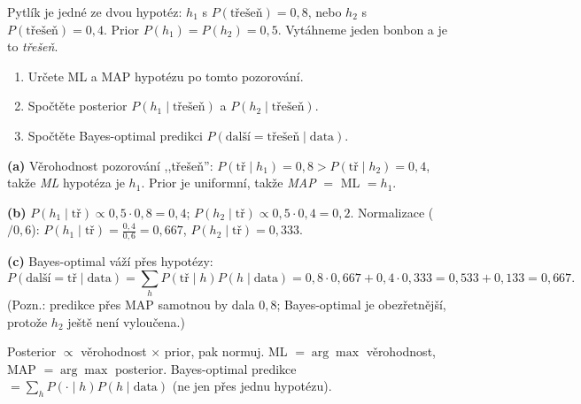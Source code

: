 \begin{zadani}
Pytlík je jedné ze dvou hypotéz: $h_1$ s $P(\text{třešeň})=0{,}8$, nebo $h_2$ s $P(\text{třešeň})=0{,}4$. Prior $P(h_1)=P(h_2)=0{,}5$. Vytáhneme jeden bonbon a je to \emph{třešeň}.
\begin{enumerate}[label=(\alph*)]
  \item {} Určete ML a MAP hypotézu po tomto pozorování.
  \item {} Spočtěte posterior $P(h_1\mid \text{třešeň})$ a $P(h_2\mid \text{třešeň})$.
  \item {} Spočtěte Bayes-optimal predikci $P(\text{další} = \text{třešeň}\mid \text{data})$.
\end{enumerate}
\end{zadani}

\begin{reseni}
\textbf{(a)} Věrohodnost pozorování ,,třešeň'': $P(\text{tř}\mid h_1)=0{,}8 > P(\text{tř}\mid h_2)=0{,}4$, takže \emph{ML} hypotéza je $h_1$. Prior je uniformní, takže \emph{MAP} $=$ ML $=h_1$.

\textbf{(b)} $P(h_1\mid\text{tř})\propto0{,}5\cdot0{,}8=0{,}4$; $P(h_2\mid\text{tř})\propto0{,}5\cdot0{,}4=0{,}2$. Normalizace ($/0{,}6$): $P(h_1\mid\text{tř})=\tfrac{0{,}4}{0{,}6}=0{,}667$, $P(h_2\mid\text{tř})=0{,}333$.

\textbf{(c)} Bayes-optimal váží přes hypotézy:
\[
P(\text{další}{=}\text{tř}\mid\text{data})=\sum_h P(\text{tř}\mid h)P(h\mid\text{data})=0{,}8\cdot0{,}667+0{,}4\cdot0{,}333=0{,}533+0{,}133=0{,}667.
\]
(Pozn.: predikce přes MAP samotnou by dala $0{,}8$; Bayes-optimal je obezřetnější, protože $h_2$ ještě není vyloučena.)
\end{reseni}

\begin{jadro}
Posterior $\propto$ věrohodnost $\times$ prior, pak normuj. ML $=\arg\max$ věrohodnost, MAP $=\arg\max$ posterior. Bayes-optimal predikce $=\sum_h P(\cdot\mid h)P(h\mid\text{data})$ (ne jen přes jednu hypotézu).
\end{jadro}

